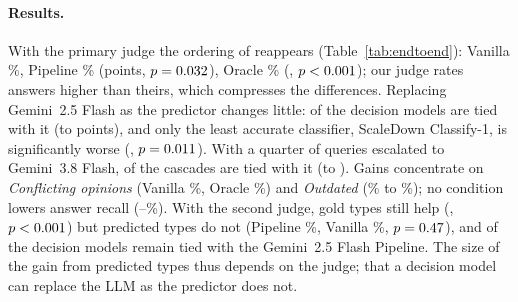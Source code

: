 

\paragraph{Results.} With the primary judge the ordering of \citet{cattan2025dragged} reappears
(Table~\ref{tab:endtoend}): Vanilla \eevan\%, Pipeline \eepipe\% (\eepipevsvandiff points, $p=0.032$), Oracle
\eeoracle\% (\eeoraclevsvandiff, $p<0.001$); our judge rates answers higher than theirs, which compresses
the differences. Replacing Gemini~2.5 Flash as the predictor changes little: \eentied of the \ndm decision models are
tied with it (\eedmdiffmin to \eedmdiffmax points), and only the least accurate classifier, ScaleDown Classify-1, is
significantly worse (\eescaledownvspipediff, $p=0.011$). With a quarter of queries escalated to
Gemini~3.8 Flash, \eencasctied of the \ndm cascades are tied with it (\eecascdiffmin to \eecascdiffmax). Gains
concentrate on \emph{Conflicting opinions} (Vanilla \eevanopin\%, Oracle \eeoracleopin\%) and \emph{Outdated}
(\eevanoutd\% to \eeoracleoutd\%); no condition lowers answer recall (\eerecallmin--\eerecallmax\%). With the second
judge, gold types still help (\fboraclevsvandiff, $p<0.001$) but predicted types do not (Pipeline \fbpipe\%,
Vanilla \fbvan\%, $p=0.47$), and \fbntied of the \ndm decision models remain tied with the Gemini~2.5 Flash
Pipeline. The size of the gain from predicted types thus depends on the judge; that a decision model can replace the
LLM as the predictor does not.
